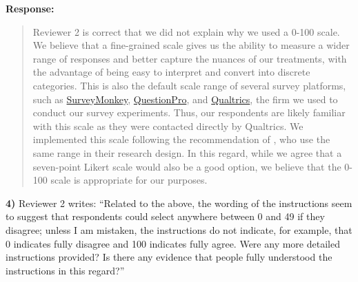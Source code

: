 \documentclass[a4paper,12pt]{article}
\begin{document}
\noindent \textbf{Response:} 
\begin{quote}

Reviewer 2 is correct that we did not explain why we used a 0-100 scale. We
believe that a fine-grained scale gives us the ability to measure a wider range
of responses and better capture the nuances of our treatments, with the
advantage of being easy to interpret and convert into discrete categories. This
is also the default scale range of several survey platforms, such as
\href{https://www.surveymonkey.co.uk/curiosity/new-introducing-slider-star-rating-question-types/}{SurveyMonkey},
\href{https://www.questionpro.com/blog/use-slider-scales-for-a-more-accurate-rating/}{QuestionPro},
and
\href{https://www.qualtrics.com/support/survey-platform/survey-module/editing-questions/question-types-guide/standard-content/slider/}{Qualtrics},
the firm we used to conduct our survey experiments. Thus, our respondents are
likely familiar with this scale as they were contacted directly by Qualtrics.
We implemented this scale following the recommendation of
\citet{carter2020}, who use the same range in their research design. In
this regard, while we agree that a seven-point Likert scale would also be a
good option, we believe that the 0-100 scale is appropriate for our purposes.

\end{quote}

\vspace{.3cm}

\noindent \textbf{4)} Reviewer 2 writes: ``Related to the above, the wording of
the instructions seem to suggest that respondents could select anywhere between
0 and 49 if they disagree; unless I am mistaken, the instructions do not
indicate, for example, that 0 indicates fully disagree and 100 indicates fully
agree. Were any more detailed instructions provided? Is there any evidence that
people fully understood the instructions in this regard?''

\vspace{.3cm}
\end{document}
